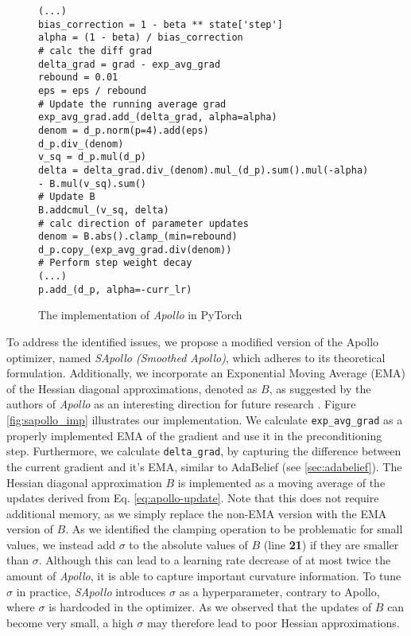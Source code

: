 \begin{figure}[H]
\begin{verbatim}
(...)
bias_correction = 1 - beta ** state['step']
alpha = (1 - beta) / bias_correction
# calc the diff grad
delta_grad = grad - exp_avg_grad
rebound = 0.01
eps = eps / rebound
# Update the running average grad
exp_avg_grad.add_(delta_grad, alpha=alpha)
denom = d_p.norm(p=4).add(eps)
d_p.div_(denom)
v_sq = d_p.mul(d_p)
delta = delta_grad.div_(denom).mul_(d_p).sum().mul(-alpha) 
- B.mul(v_sq).sum()
# Update B
B.addcmul_(v_sq, delta)
# calc direction of parameter updates
denom = B.abs().clamp_(min=rebound)
d_p.copy_(exp_avg_grad.div(denom))
# Perform step weight decay
(...)
p.add_(d_p, alpha=-curr_lr)
\end{verbatim}
    \caption{The implementation of \emph{Apollo} in PyTorch}
    \label{fig:apollo_imp}
    \end{figure}
    To address the identified issues, we propose a modified version of the Apollo optimizer, named \emph{SApollo (Smoothed Apollo)}, which adheres to its theoretical formulation. Additionally, we incorporate an Exponential Moving Average (EMA) of the Hessian diagonal approximations, denoted as $B$, as suggested by the authors of \emph{Apollo} as an interesting direction for future research \cite{apollo}.
    Figure \ref{fig:sapollo_imp} illustrates our implementation. We calculate \texttt{exp\_avg\_grad} as a properly implemented EMA of the gradient and use it in the preconditioning step.
    Furthermore, we calculate \texttt{delta\_grad}, by capturing the difference between the current gradient and it's EMA, similar to AdaBelief (see \ref{sec:adabelief}).
    The Hessian diagonal approximation $B$ is implemented as a moving average of the updates derived from Eq. \ref{eq:apollo-update}.
    Note that this does not require additional memory, as we simply replace the non-EMA version with the EMA version of $B$.
    As we identified the clamping operation to be problematic for small values, we instead add $\sigma$ to the absolute values of $B$ (line \textbf{21}) if they are smaller than $\sigma$.
    Although this can lead to a learning rate decrease of at most twice the amount of \emph{Apollo}, it is able to capture
    important curvature information. To tune $\sigma$ in practice, \emph{SApollo} introduces $\sigma$ as a hyperparameter, contrary to Apollo,
    where $\sigma$ is hardcoded in the optimizer.
    As we observed that the updates of $B$ can become very small, a high $\sigma$ may therefore lead to poor Hessian approximations.
